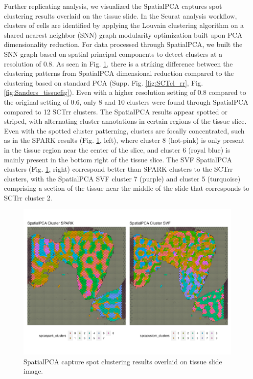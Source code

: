 \documentclass{article}
\begin{document}
Further replicating \citet{sanders_small_2022} analysis, we visualized the SpatialPCA captures spot clustering results overlaid on the tissue slide. In the Seurat analysis workflow, clusters of cells are identified by applying the Louvain clustering algorithm on a shared nearest neighbor (SNN) graph modularity optimization built upon PCA dimensionality reduction. For data processed through SpatialPCA, we built the SNN graph based on spatial principal components to detect clusters at a resolution of 0.8. As seen in Fig. \ref{fig:SpatialPlotCl}, there is a striking difference between the clustering patterns from SpatialPCA dimensional reduction compared to the clustering based on standard PCA (Supp. Fig. \ref{fig:SCTcl_rr}, Fig. \ref{fig:Sanders_tissuefig}). Even with a higher resolution setting of 0.8 compared to the original setting of 0.6, only 8 and 10 clusters were found through SpatialPCA compared to 12 SCTrr clusters. The SpatialPCA results appear spotted or striped, with alternating cluster annotations in certain regions of the tissue slice. Even with the spotted cluster patterning, clusters are focally concentrated, such as in the SPARK results (Fig. \ref{fig:SpatialPlotCl}, left), where cluster 8 (hot-pink) is only present in the tissue region near the center of the slice, and cluster 6 (royal blue) is mainly present in the bottom right of the tissue slice. The SVF SpatialPCA clusters (Fig. \ref{fig:SpatialPlotCl}, right) correspond better than SPARK clusters to the SCTrr clusters, with the SpatialPCA SVF cluster 7 (purple) and cluster 5 (turquoise) comprising a section of the tissue near the middle of the slide that corresponds to SCTrr cluster 2.

\begin{figure}[h!]
    \centering
    \includegraphics[width=\textwidth]{images/SpatialDimPlot_D_GTFB1170_SmallCellOvarianCancer_pw_clusters_spcasparksvf.png}
    \caption{SpatialPCA capture spot clustering results overlaid on tissue slide image.}
    \label{fig:SpatialPlotCl}
\end{figure}
\end{document}
